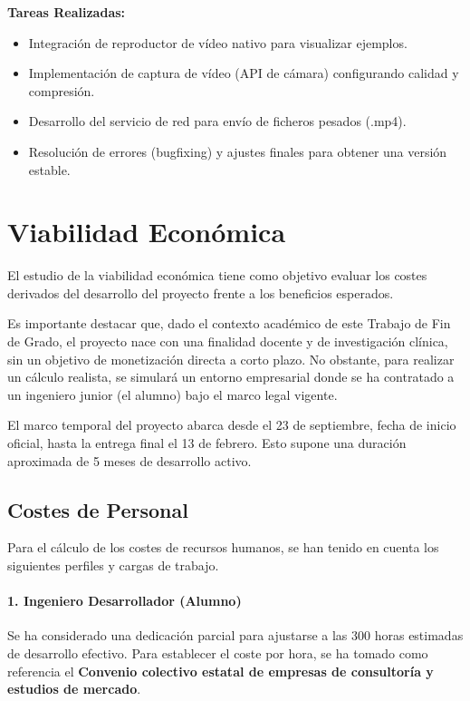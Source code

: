 \textbf{Tareas Realizadas:}
\begin{itemize}
    \item Integración de reproductor de vídeo nativo para visualizar ejemplos.
    \item Implementación de captura de vídeo (API de cámara) configurando calidad y compresión.
    \item Desarrollo del servicio de red para envío de ficheros pesados (.mp4).
    \item Resolución de errores (bugfixing) y ajustes finales para obtener una versión estable.
\end{itemize}

\section{Viabilidad Económica}

El estudio de la viabilidad económica tiene como objetivo evaluar los costes derivados del desarrollo del proyecto frente a los beneficios esperados.

Es importante destacar que, dado el contexto académico de este Trabajo de Fin de Grado, el proyecto nace con una finalidad docente y de investigación clínica, sin un objetivo de monetización directa a corto plazo. No obstante, para realizar un cálculo realista, se simulará un entorno empresarial donde se ha contratado a un ingeniero junior (el alumno) bajo el marco legal vigente.

El marco temporal del proyecto abarca desde el 23 de septiembre, fecha de inicio oficial, hasta la entrega final el 13 de febrero. Esto supone una duración aproximada de 5 meses de desarrollo activo.

\subsection{Costes de Personal}
Para el cálculo de los costes de recursos humanos, se han tenido en cuenta los siguientes perfiles y cargas de trabajo.

\paragraph{1. Ingeniero Desarrollador (Alumno)}
Se ha considerado una dedicación parcial para ajustarse a las 300 horas estimadas de desarrollo efectivo. Para establecer el coste por hora, se ha tomado como referencia el \textbf{Convenio colectivo estatal de empresas de consultoría y estudios de mercado}\cite{boe_convenio_tic_2025}.

